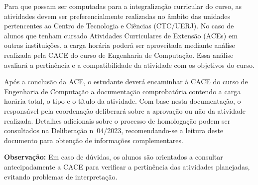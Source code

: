 Para que possam ser computadas para a integralização curricular do curso, as atividades devem ser preferencialmente realizadas no âmbito das unidades pertencentes ao Centro de Tecnologia e Ciências (CTC/UERJ). No caso de alunos que tenham cursado Atividades Curriculares de Extensão (ACEs) em outras instituições, a carga horária poderá ser aproveitada mediante análise realizada pela CACE do curso de Engenharia de Computação. Essa análise avaliará a pertinência e a compatibilidade da atividade com os objetivos do curso. 

Após a conclusão da ACE, o estudante deverá encaminhar à CACE do curso de Engenharia de Computação a documentação comprobatória contendo a carga horária total, o tipo e o título da atividade. Com base nesta documentação, o responsável pela coordenação deliberará sobre a aprovação ou não da atividade realizada. Detalhes adicionais sobre o processo de homologação podem ser consultados na Deliberação n\textordmasculine~04/2023, recomendando-se a leitura deste documento para obtenção de informações complementares.

\textbf{Observação:} Em caso de dúvidas, os alunos são orientados a consultar antecipadamente a CACE para verificar a pertinência das atividades planejadas, evitando problemas de interpretação.
